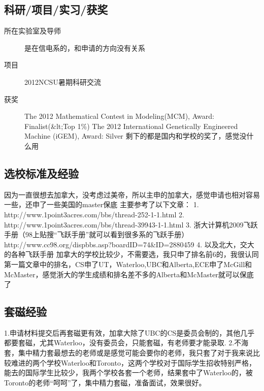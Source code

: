 \documentclass[11pt,fleqn,openany]{book} %
\begin{document}
\subsection*{科研/项目/实习/获奖}
\begin{description}
\item[所在实验室及导师] 是在信电系的，和申请的方向没有关系
\item[项目] 2012NCSU暑期科研交流
\item[获奖] The 2012 Mathematical Contest in Modeling(MCM), Award: Finalist(\&lt;Top 1\%)
The 2012 International Genetically Engineered Machine (iGEM), Award: Silver
剩下的都是国内和学校的奖了，感觉没什么用
\end{description}
\subsection*{选校标准及经验}
因为一直很想去加拿大，没考虑过美帝，所以主申的加拿大，感觉申请也相对容易一些，还申了一些美国的master保底
主要参考了以下文章：
1. http://www.1point3acres.com/bbs/thread-252-1-1.html
2. http://www.1point3acres.com/bbs/thread-39943-1-1.html
3. 浙大计算机2009飞跃手册（98上贴搜“飞跃手册”就可以看到很多系的飞跃手册）
http://www.cc98.org/dispbbs.asp?boardID=74\&ID=2880459
4. 以及北大，交大的各种飞跃手册
加拿大的学校比较少，不需要选，我只申了排名前6的，我很认同第一篇文章中的排名，CS申了UT，Waterloo,UBC和Alberta,ECE申了McGill和McMaster，感觉浙大的学生成绩和排名差不多的Alberta和McMaster就可以保底了
\subsection*{套磁经验}
1.申请材料提交后再套磁更有效，加拿大除了UBC的CS是委员会制的，其他几乎都要套磁，尤其Waterloo，没有委员会，只能套磁，有老师要才能录取.
2.不海套，集中精力套最想去的老师或是感觉可能会要你的老师，我只套了对于我来说比较难进的两个学校Waterloo和Toronto，这两个学校对于国际学生招收特别严格，能去的国际学生比较少，我两个学校各套一个老师，结果套中了Waterloo的，被Toronto的老师“呵呵”了，集中精力套磁，准备面试，效果很好。
\end{document}
